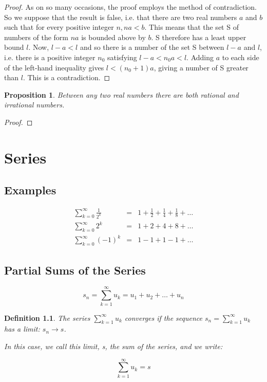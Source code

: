 \message{ !name(RealAnalysis.tex)}\documentclass[12pt]{scrbook}
\newtheorem*{definition}{Definition}
\newtheorem{proposition}{Proposition}[section]
\begin{document}
\begin{proof}
As on so many occasions, the proof employs the method of contradiction.  So we suppose that the result is false, i.e. that there are two real numbers $a$ and $b$ such that for every positive integer $n, na < b$. This means that the set S of numbers of the form $na$ is bounded above by $b$.  S therefore has a least upper bound $l$.  Now, $l - a < l$ and so there is a number of the set S between $l - a$ and $l$, i.e. there is a positive integer $n_0$ satisfying $l - a < n_0 a < l$.  Adding $a$ to each side of the left-hand inequality gives $l < (n_0 + 1)a$, giving a number of S greater than $l$.  This is a contradiction.
\end{proof}

\begin{proposition}
Between any two real numbers there are both rational and irrational numbers.
\end{proposition}

\begin{proof}

\end{proof}


\chapter{Series}

\section{Examples}

\begin{eqnarray*}
\sum_{k=0}^{\infty} \frac{1}{2^k} 	&=& 1 + \frac{1}{2} + \frac{1}{4} + \frac{1}{8} + \ldots  \\
\sum_{k=0}^{\infty} 2^k			&=& 1 + 2 + 4 + 8 + \ldots  \\
\sum_{k=0}^{\infty} (-1)^k 			&=& 1 - 1 + 1 - 1 + \ldots 
\end{eqnarray*}

\section{Partial Sums of the Series}

\[ s_n = \sum_{k=1}^{\infty} u_k = u_1 + u_2 + \ldots + u_n \]

\begin{definition}
The series $\sum_{k=1}^{\infty} u_k$ converges if the sequence $s_n = \sum_{k=1}^{\infty} u_k$ has a limit: 
$s_n \rightarrow s$.

In this case, we call this limit, s, the sum of the series, and we write:

\[  \sum_{k=1}^{\infty} u_k = s \]
\end{definition}
\end{document}

